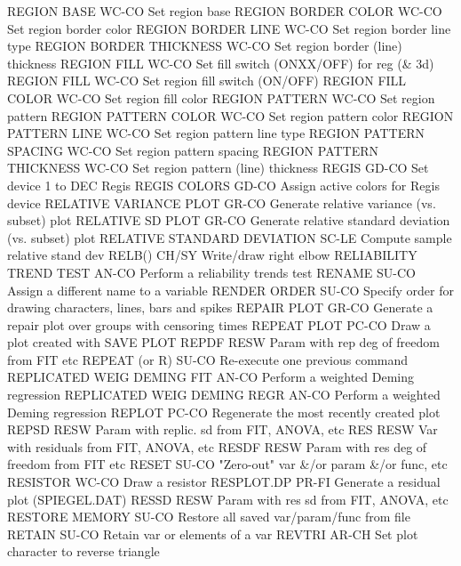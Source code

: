 REGION BASE                 WC-CO Set region base
REGION BORDER COLOR         WC-CO Set region border color
REGION BORDER LINE          WC-CO Set region border line type
REGION BORDER THICKNESS     WC-CO Set region border (line) thickness
REGION FILL                 WC-CO Set fill switch (ONXX/OFF) for reg (& 3d)
REGION FILL                 WC-CO Set region fill switch (ON/OFF)
REGION FILL COLOR           WC-CO Set region fill color
REGION PATTERN              WC-CO Set region pattern
REGION PATTERN COLOR        WC-CO Set region pattern color
REGION PATTERN LINE         WC-CO Set region pattern line type
REGION PATTERN SPACING      WC-CO Set region pattern spacing
REGION PATTERN THICKNESS    WC-CO Set region pattern (line) thickness
REGIS                       GD-CO Set device 1 to DEC Regis
REGIS COLORS                GD-CO Assign active colors for Regis device
RELATIVE VARIANCE PLOT      GR-CO Generate relative variance (vs. subset) plot
RELATIVE SD PLOT            GR-CO Generate relative standard deviation (vs. subset) plot
RELATIVE STANDARD DEVIATION SC-LE Compute sample relative stand dev
RELB()                      CH/SY Write/draw right elbow
RELIABILITY TREND TEST      AN-CO Perform a reliability trends test
RENAME                      SU-CO Assign a different name to a variable
RENDER ORDER                SU-CO Specify order for drawing characters, lines, bars and spikes
REPAIR PLOT                 GR-CO Generate a repair plot over groups with censoring times
REPEAT PLOT                 PC-CO Draw a plot created with SAVE PLOT
REPDF                       RESW  Param with rep deg of freedom from FIT etc
REPEAT (or R)               SU-CO Re-execute one previous command
REPLICATED WEIG DEMING FIT  AN-CO Perform a weighted Deming regression
REPLICATED WEIG DEMING REGR AN-CO Perform a weighted Deming regression
REPLOT                      PC-CO Regenerate the most recently created plot
REPSD                       RESW  Param with replic. sd from FIT, ANOVA, etc
RES                         RESW  Var with residuals from FIT, ANOVA, etc
RESDF                       RESW  Param with res deg of freedom from FIT etc
RESET                       SU-CO "Zero-out" var &/or param &/or func, etc
RESISTOR                    WC-CO Draw a resistor
RESPLOT.DP                  PR-FI Generate a residual plot (SPIEGEL.DAT)
RESSD                       RESW  Param with res sd from FIT, ANOVA, etc
RESTORE MEMORY              SU-CO Restore all saved var/param/func from file
RETAIN                      SU-CO Retain var or elements of a var
REVTRI                      AR-CH Set plot character to reverse triangle
